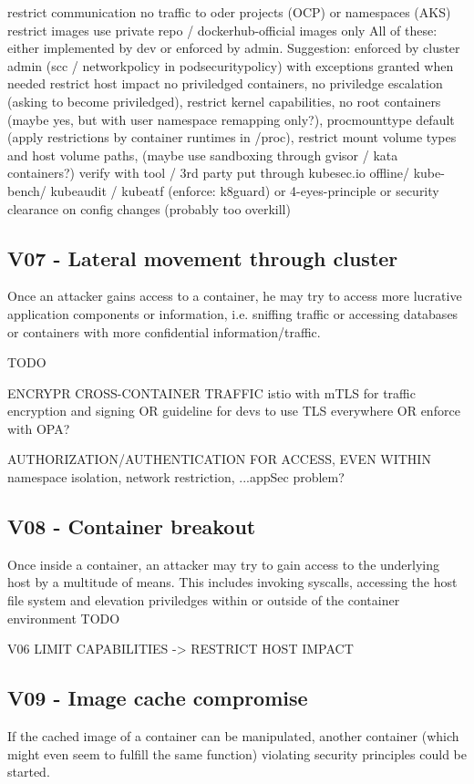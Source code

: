 	restrict communication			no traffic to oder projects (OCP) or namespaces (AKS)						
	restrict images			use private repo / dockerhub-official images only						All of these: either implemented by dev or enforced by admin. Suggestion: enforced by cluster admin (scc / networkpolicy in podsecuritypolicy) with exceptions granted when needed
	restrict host impact			no priviledged containers, no priviledge escalation (asking to become priviledged), restrict kernel capabilities, no root containers (maybe yes, but with user namespace remapping only?), procmounttype default (apply restrictions by container runtimes in /proc), restrict mount volume types and host volume paths, (maybe use sandboxing through gvisor / kata containers?)						
	verify with tool / 3rd party			put through kubesec.io offline/ kube-bench/ kubeaudit / kubeatf (enforce: k8guard) or 4-eyes-principle or security clearance on config changes (probably too overkill)						


\subsection{V07 - Lateral movement through cluster}
Once an attacker gains access to a container, he may try to access more lucrative application components or information, i.e. sniffing traffic or accessing databases or containers with more confidential information/traffic.

TODO

ENCRYPR CROSS-CONTAINER TRAFFIC
	istio with mTLS for traffic encryption and signing OR guideline for devs to use TLS everywhere OR enforce with OPA?		
			
AUTHORIZATION/AUTHENTICATION FOR ACCESS, EVEN WITHIN
	namespace isolation, network restriction, ...appSec problem?

\subsection{V08 - Container breakout}
Once inside a container, an attacker may try to gain access to the underlying host by a multitude of means. This includes invoking syscalls, accessing the host file system and elevation priviledges within or outside of the container environment
TODO

V06 LIMIT CAPABILITIES -> RESTRICT HOST IMPACT

\subsection{V09 - Image cache compromise}
If the cached image of a container can be manipulated, another container (which might even seem to fulfill the same function) violating security principles could be started.

